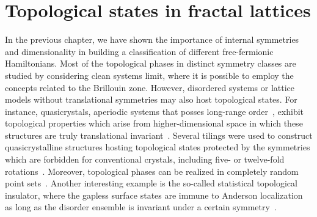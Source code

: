 \chapter{Topological states in fractal lattices}
\label{ch:fractals}
In the previous chapter, we have shown the importance of internal symmetries and dimensionality in building a classification of different free-fermionic Hamiltonians. Most of the topological phases in distinct symmetry classes are studied by considering clean systems limit, where it is possible to employ the concepts related to the Brillouin zone. However, disordered systems or lattice models without translational symmetries may also host topological states. For instance, quasicrystals, aperiodic systems that posses long-range order~\cite{quasicrystals}, exhibit topological properties which arise from higher-dimensional space in which these structures are truly translational invariant~\cite{PhysRevLett.109.106402}. Several tilings were used to construct quasicrystalline structures hosting topological states protected by the symmetries which are forbidden for conventional crystals, including five- or twelve-fold rotations~\cite{PhysRevLett.124.036803,PhysRevLett.123.196401}. Moreover, topological phases can be realized in completely random point sets~\cite{AmorphTIShenoy2017}. Another interesting example is the so-called statistical topological insulator, where the gapless surface states are immune to Anderson localization as long as the disorder ensemble is invariant under a certain symmetry~\cite{statTI2014}.

